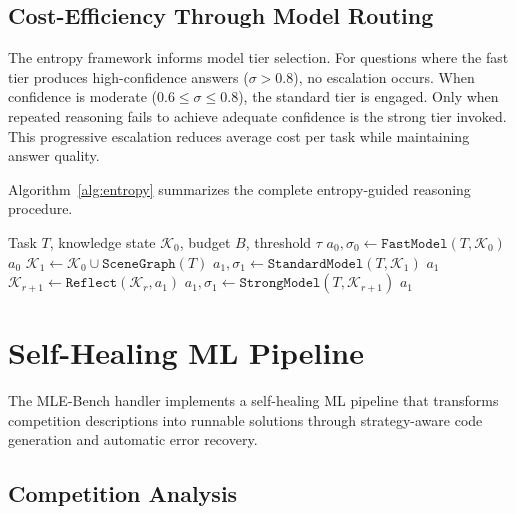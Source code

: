 \documentclass[11pt]{article}
\begin{document}
\subsection{Cost-Efficiency Through Model Routing}

The entropy framework informs model tier selection. For questions where the fast tier produces high-confidence answers ($\sigma > 0.8$), no escalation occurs. When confidence is moderate ($0.6 \leq \sigma \leq 0.8$), the standard tier is engaged. Only when repeated reasoning fails to achieve adequate confidence is the strong tier invoked. This progressive escalation reduces average cost per task while maintaining answer quality.

Algorithm~\ref{alg:entropy} summarizes the complete entropy-guided reasoning procedure.

\begin{algorithm}[t]
\caption{Entropy-Guided Reasoning}
\label{alg:entropy}
\begin{algorithmic}[1]
\REQUIRE Task $T$, knowledge state $\mathcal{K}_0$, budget $B$, threshold $\tau$
\STATE $a_0, \sigma_0 \leftarrow \texttt{FastModel}(T, \mathcal{K}_0)$
  \RETURN $a_0$
\ENDIF
\STATE $\mathcal{K}_1 \leftarrow \mathcal{K}_0 \cup \texttt{SceneGraph}(T)$
\STATE $a_1, \sigma_1 \leftarrow \texttt{StandardModel}(T, \mathcal{K}_1)$
  \IF{$\sigma_1 \geq \tau$}
    \RETURN $a_1$
  \ENDIF
  \STATE $\mathcal{K}_{r+1} \leftarrow \texttt{Reflect}(\mathcal{K}_r, a_1)$
  \STATE $a_1, \sigma_1 \leftarrow \texttt{StrongModel}(T, \mathcal{K}_{r+1})$
\ENDFOR
\RETURN $a_1$
\end{algorithmic}
\end{algorithm}

\section{Self-Healing ML Pipeline}
\label{sec:ml}

The MLE-Bench handler implements a self-healing ML pipeline that transforms competition descriptions into runnable solutions through strategy-aware code generation and automatic error recovery.

\subsection{Competition Analysis}
\end{document}
